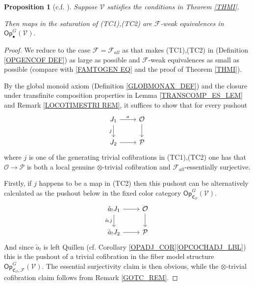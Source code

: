\documentclass[a4paper,10pt
,draft
]{article}%
\numberwithin{equation}{section}
\numberwithin{figure}{section}
\newtheorem{proposition}[equation]{Proposition}%
\theoremstyle{definition} %
\newcommand{\F}{\ensuremath{\mathcal F}}
\newcommand{\V}{\ensuremath{\mathcal V}}
\renewcommand{\O}{\ensuremath{\mathcal O}}
\renewcommand{\P}{\ensuremath{\mathcal P}}
\newcommand{\1}{\ensuremath{\mathbbm 1}}%
\begin{document}
\begin{proposition}[{c.f. \cite[4.20]{Cav}}]\label{J-CELL_PROP}
	Suppose $\V$ satisfies the conditions in Theorem \ref{THMI}.
      
	Then maps in the saturation of (TC1),(TC2) 
	are $\F$-weak equivalences in $\mathsf{Op}^G_{\bullet}(\V)$.
\end{proposition}



\begin{proof}
	We reduce to the case
	$\F=\F_{all}$ as that makes (TC1),(TC2) in (Definition \ref{OPGENCOF DEF}) as large as possible 
	and $\mathcal{F}$-weak equivalences as small as possible
	(compare with \eqref{FAMTOGEN EQ} and the proof of Theorem \ref{THMI}).
		
	By the global monoid axiom (Definition \ref{GLOBMONAX_DEF}) and
	the closure under transfinite composition properties in Lemma \ref{TRANSCOMP_ES_LEM} and Remark \ref{LOCOTIMESTRI REM},
	it suffices to show that for every pushout
\begin{equation}\label{JUSTAPUSH EQ}
\begin{tikzcd}
	J_1 \ar{r}{a} \arrow{d}[swap]{j}
&
	\O \arrow{d}
\\
	J_2 \ar{r} 
&
	\P
\end{tikzcd}
\end{equation}
	where $j$ is one of the generating trivial cofibrations 
	in (TC1),(TC2) 
	one has that 
	$\O \to \mathcal{P}$ is both a local genuine $\otimes$-trivial cofibration and $\F_{all}$-essentially surjective.

	Firstly, if $j$ happens to be a map in (TC2)
	then this pushout
	can be alternatively calculated as the pushout below
	in the fixed color category $\mathsf{Op}^{G}_{\mathfrak C_{\O}}(\V)$.
\begin{equation}
\begin{tikzcd}
\check{a}_!J_1 \ar{r} \arrow{d}[swap]{\check{a}_!j}
&
\O \arrow{d}
\\
\check{a}_!J_2 \ar{r} 
&
\P
\end{tikzcd}
\end{equation}      
      And since $\check{a}_!$ is left Quillen (cf. Corollary \ref{OPADJ_COR}\ref{OPCOCHADJ_LBL}) %
      this is the pushout of a trivial cofibration in the fiber model structure
      $\mathsf{Op}^{G}_{\mathfrak C_{\O},\F}(\V)$.
	The essential surjectivity claim is then obvious,
	while the $\otimes$-trivial cofibration
	claim follows from 
	Remark \ref{GOTC_REM}.


\end{proof}
\end{document}
